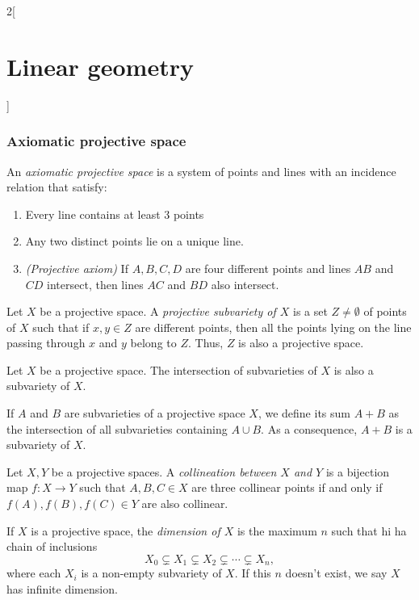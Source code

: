 \documentclass[class=article,10pt,crop=false]{standalone}
\begin{document}
\begin{multicols}{2}[\section{Linear geometry}]
\subsubsection*{Axiomatic projective space}
\begin{definition}
An \textit{axiomatic projective space} is a system of points and lines with an incidence relation that satisfy:
\begin{enumerate}
    \item Every line contains at least 3 points
    \item Any two distinct points lie on a unique line.
    \item \textit{(Projective axiom)} If $A,B,C,D$ are four different points and lines $AB$ and $CD$ intersect, then lines $AC$ and $BD$ also intersect.
\end{enumerate}
\end{definition}
\begin{definition}
Let $X$ be a projective space. A \textit{projective subvariety of $X$} is a set $Z\ne\emptyset$ of points of $X$ such that if $x,y\in Z$ are different points, then all the points lying on the line passing through $x$ and $y$ belong to $Z$. Thus, $Z$ is also a projective space.
\end{definition}
\begin{prop}
Let $X$ be a projective space. The intersection of subvarieties of $X$ is also a subvariety of $X$.
\end{prop}
\begin{prop}
If $A$ and $B$ are subvarieties of a projective space $X$, we define its sum $A+B$ as the intersection of all subvarieties containing $A\cup B$. As a consequence, $A+B$ is a subvariety of $X$.
\end{prop}
\begin{definition}
Let $X,Y$ be a projective spaces. A \textit{collineation between $X$ and $Y$} is a bijection map $f:X\rightarrow Y$ such that $A,B,C\in X$ are three collinear points if and only if $f(A),f(B),f(C)\in Y$ are also collinear.
\end{definition}
\begin{definition}
If $X$ is a projective space, the \textit{dimension of $X$} is the maximum $n$ such that hi ha chain of inclusions $$X_0\varsubsetneq X_1\varsubsetneq X_2 \varsubsetneq\cdots\varsubsetneq X_n,$$ where each $X_i$ is a non-empty subvariety of $X$. If this $n$ doesn't exist, we say $X$ has infinite dimension.
\end{definition}
\begin{definition}

\end{definition}
\end{multicols}
\end{document}
